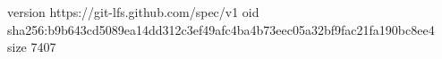 version https://git-lfs.github.com/spec/v1
oid sha256:b9b643cd5089ea14dd312c3ef49afc4ba4b73eec05a32bf9fac21fa190bc8ee4
size 7407
